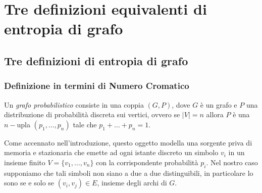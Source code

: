 \chapter{Tre definizioni equivalenti di entropia di grafo} 
\section{Tre definizioni di entropia di grafo} 
\subsection{Definizione in termini di Numero Cromatico} \label{codinganalogy} 
\begin{definition}
	Un \emph{grafo probabilistico} consiste in una coppia \((G,P)\), dove \(G\) è un grafo e \(P\) una distribuzione di probabilità discreta sui vertici, ovvero se \(|V|=n\) allora \(P\) è una \(n-\)upla \((p_1,\dots ,p_n)\) tale che \(p_1 + \dots + p_n = 1\). 
\end{definition}
Come accennato nell'introduzione, questo oggetto modella una sorgente priva di memoria e stazionaria che emette ad ogni istante discreto un simbolo \(v_i\) in un insieme finito \(V=\{v_1,\dots ,v_n\}\) con la corrispondente probabilità \(p_i\). Nel nostro caso supponiamo che tali simboli non siano a due a due distinguibili, in particolare lo sono se e solo se \((v_i, v_j) \in E\), insieme degli archi di \(G\).

